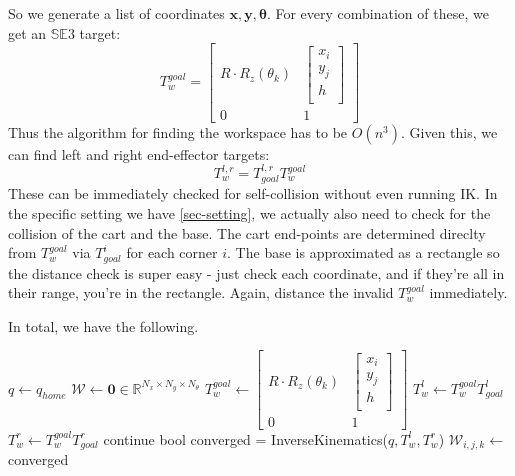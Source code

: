 \documentclass{article}
\begin{document}
So we generate a list of coordinates
$\bm{x}, \bm{y}, \bm{\theta}$.
For every combination of these, we get an $\mathbb{SE}3$ target:
\begin{equation}
T_w^{goal} = 
\begin{bmatrix} 
	R \cdot R_z (\theta_k) & \begin{bmatrix}
				 x_i \\
				 y_j \\
				 h \\ 
				\end{bmatrix} \\
	0 & 1
\end{bmatrix}
\end{equation}
Thus the algorithm for finding the workspace
has to be $O(n^3)$.
Given this, we can find left and right end-effector targets:
\begin{equation}
	T_w^{l,r} = T_{goal}^{l,r} T_w^{goal}
\end{equation}
These can be immediately checked for self-collision without even running IK.
In the specific setting we have \ref{sec-setting},
we actually also need to check for the collision of the cart and the base.
The cart end-points are determined direclty from $T_w^{goal}$
via $T_{goal}^{i}$ for each corner $i$.
The base is approximated as a rectangle so the distance check
is super easy - just check each coordinate,
and if they're all in their range, you're in the rectangle.
Again, distance the invalid $T_w^{goal}$ immediately.

In total, we have the following.


\begin{algorithm}[H]
\label{workspace-finding-algorithm}
\caption{Workspace finding algorithm}\label{alg:workspace_finding}
\begin{algorithmic}[1] %
	\State $q \gets q_{home}$
	\State $\mathcal{W} \gets \bm{0} \in \mathbb{R}^{N_x \times N_y \times N_{\theta}}$
	\State $T_w^{goal} \gets 
\begin{bmatrix} 
	R \cdot R_z (\theta_k) & \begin{bmatrix}
				 x_i \\
				 y_j \\
				 h \\ 
				\end{bmatrix} \\
	0 & 1
\end{bmatrix}$
\State $T_w^l \gets  T_w^{goal} T_{goal}^l$
\State $T_w^r \gets  T_w^{goal} T_{goal}^r$
\State continue
\EndIf
\State bool converged = InverseKinematics($q, T_w^l, T_w^r$)
\State $\mathcal{W}_{i,j,k} \gets $ converged
\EndFor
\EndProcedure
\end{algorithmic}
\end{algorithm}
\end{document}
